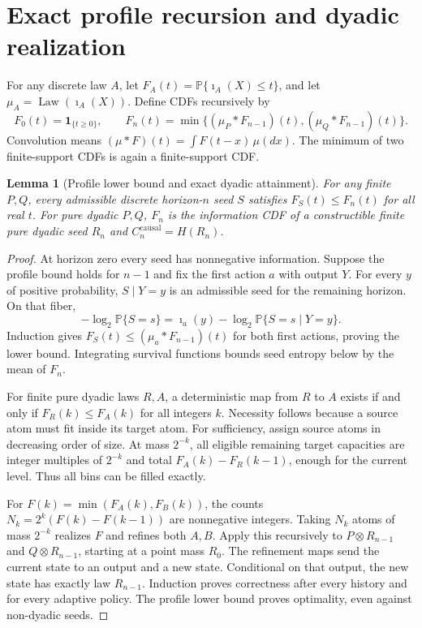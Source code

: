 \documentclass[11pt,a4paper]{article}
\newtheorem{lemma}[theorem]{Lemma}
\numberwithin{equation}{section}
\newcommand{\Prb}{\mathbb P}
\newcommand{\Law}{\operatorname{Law}}
\newcommand{\ii}{\imath}
\begin{document}
\section{Exact profile recursion and dyadic realization}
For any discrete law $A$, let $F_A(t)=\Prb\{\ii_A(X)\le t\}$, and let
$\mu_A=\Law(\ii_A(X))$. Define CDFs recursively by
\begin{equation}\label{eq:F}
F_0(t)=\mathbf1_{\{t\ge0\}},\qquad
F_n(t)=\min\{(\mu_P*F_{n-1})(t),(\mu_Q*F_{n-1})(t)\}.
\end{equation}
Convolution means $(\mu*F)(t)=\int F(t-x)\,\mu(dx)$.
The minimum of two finite-support CDFs is again a finite-support CDF.

\begin{lemma}[Profile lower bound and exact dyadic attainment]\label{lem:optimal}
For any finite $P,Q$, every admissible discrete horizon-$n$ seed $S$
satisfies $F_S(t)\le F_n(t)$ for all real $t$.
For pure dyadic $P,Q$, $F_n$ is the information CDF of a constructible
finite pure dyadic seed $R_n$ and
$C_n^{\mathrm{causal}}=H(R_n)$.
\end{lemma}
\begin{proof}
At horizon zero every seed has nonnegative information. Suppose the
profile bound holds for $n-1$ and fix the first action $a$ with output $Y$.
For every $y$ of positive probability, $S\mid Y=y$ is an admissible seed
for the remaining horizon. On that fiber,
\[
-\log_2\Prb\{S=s\}=
\ii_a(y)-\log_2\Prb\{S=s\mid Y=y\}.
\]
Induction gives $F_S(t)\le(\mu_a*F_{n-1})(t)$ for both first actions,
proving the lower bound. Integrating survival functions bounds seed
entropy below by the mean of $F_n$.

For finite pure dyadic laws $R,A$, a deterministic map from $R$ to $A$
exists if and only if $F_R(k)\le F_A(k)$ for all integers $k$.
Necessity follows because a source atom must fit inside its target atom.
For sufficiency, assign source atoms in decreasing order of size. At
mass $2^{-k}$, all eligible remaining target capacities are integer
multiples of $2^{-k}$ and total $F_A(k)-F_R(k-1)$, enough for the current
level. Thus all bins can be filled exactly.

For $F(k)=\min(F_A(k),F_B(k))$, the counts
$N_k=2^k(F(k)-F(k-1))$ are nonnegative integers. Taking $N_k$ atoms of
mass $2^{-k}$ realizes $F$ and refines both $A,B$.
Apply this recursively to $P\otimes R_{n-1}$ and $Q\otimes R_{n-1}$,
starting at a point mass $R_0$. The refinement maps send the current
state to an output and a new state. Conditional on that output, the new
state has exactly law $R_{n-1}$. Induction proves correctness after every
history and for every adaptive policy. The profile lower bound proves
optimality, even against non-dyadic seeds.
\end{proof}
\end{document}
